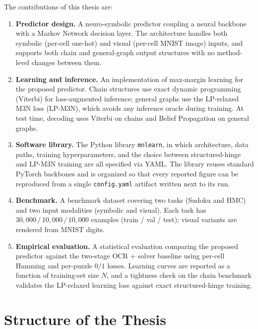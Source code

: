 The contributions of this thesis are:
\begin{enumerate}
    \item \textbf{Predictor design.} A neuro-symbolic predictor
    coupling a neural backbone with a Markov Network decision
    layer. The architecture handles both symbolic (per-cell
    one-hot) and visual (per-cell MNIST image) inputs, and
    supports both chain and general-graph output structures with
    no method-level changes between them.
    \item \textbf{Learning and inference.} An implementation of
    max-margin learning for the proposed predictor. Chain
    structures use exact dynamic programming (Viterbi) for
    loss-augmented inference; general graphs use the LP-relaxed
    M3N loss (LP-M3N), which avoids any inference oracle during
    training. At test time, decoding uses Viterbi on chains and
    Belief Propagation on general graphs.
    \item \textbf{Software library.} The Python library
    \texttt{mnlearn}, in which architecture, data paths,
    training hyperparameters, and the choice between
    structured-hinge and LP-M3N training are all specified via
    YAML. The library reuses standard PyTorch backbones and is
    organized so that every reported figure can be reproduced
    from a single \texttt{config.yaml} artifact written next to
    its run.
    \item \textbf{Benchmark.} A benchmark dataset covering two
    tasks (Sudoku and HMC) and two input modalities (symbolic
    and visual). Each task has $30{,}000\,/\,10{,}000\,/\,10{,}000$
    examples (train / val / test); visual variants are rendered
    from MNIST digits.
    \item \textbf{Empirical evaluation.} A statistical evaluation
    comparing the proposed predictor against the two-stage
    OCR + solver baseline using per-cell Hamming and per-puzzle
    $0/1$ losses. Learning curves are reported as a function of
    training-set size $N$, and a tightness check on the chain
    benchmark validates the LP-relaxed learning loss against
    exact structured-hinge training.
\end{enumerate}

\section{Structure of the Thesis}

